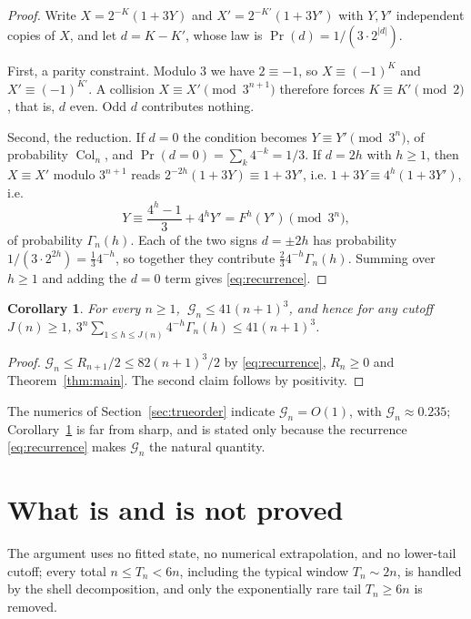 \documentclass[11pt,reqno]{amsart}
\theoremstyle{plain}
\newtheorem{corollary}[theorem]{Corollary}
\theoremstyle{definition}
\theoremstyle{remark}
\newcommand{\Col}{\operatorname{Col}}
\newcommand{\Prob}{\operatorname{Pr}}
\begin{document}
\begin{proof}
Write $X=2^{-K}(1+3Y)$ and $X'=2^{-K'}(1+3Y')$ with $Y,Y'$ independent
copies of $X$, and let $d=K-K'$, whose law is
$\Prob(d)=1/(3\cdot2^{|d|})$.

First, a parity constraint. Modulo $3$ we have $2\equiv-1$, so
$X\equiv(-1)^K$ and $X'\equiv(-1)^{K'}$. A collision $X\equiv X'\pmod
{3^{n+1}}$ therefore forces $K\equiv K'\pmod2$, that is, $d$ even. Odd $d$
contributes nothing.

Second, the reduction. If $d=0$ the condition becomes $Y\equiv Y'\pmod
{3^n}$, of probability $\Col_n$, and $\Prob(d=0)=\sum_k4^{-k}=1/3$. If
$d=2h$ with $h\ge1$, then $X\equiv X'$ modulo $3^{n+1}$ reads
$2^{-2h}(1+3Y)\equiv1+3Y'$, i.e. $1+3Y\equiv4^h(1+3Y')$, i.e.
\[
Y\equiv\frac{4^h-1}3+4^hY'=F^h(Y')\pmod{3^n},
\]
of probability $\Gamma_n(h)$. Each of the two signs $d=\pm2h$ has
probability $1/(3\cdot2^{2h})=\tfrac13 4^{-h}$, so together they contribute
$\tfrac23 4^{-h}\Gamma_n(h)$. Summing over $h\ge1$ and adding the $d=0$
term gives \eqref{eq:recurrence}.
\end{proof}

\begin{corollary}\label{cor:G}
For every $n\ge1$, $\ \mathcal G_n\le41(n+1)^3$, and hence for any cutoff
$J(n)\ge1$,
$3^n\sum_{1\le h\le J(n)}4^{-h}\Gamma_n(h)\le41(n+1)^3$.
\end{corollary}

\begin{proof}
$\mathcal G_n\le R_{n+1}/2\le82(n+1)^3/2$ by \eqref{eq:recurrence},
$R_n\ge0$ and Theorem~\ref{thm:main}. The second claim follows by
positivity.
\end{proof}

The numerics of Section~\ref{sec:trueorder} indicate
$\mathcal G_n=O(1)$, with $\mathcal G_n\approx0.235$; Corollary~\ref{cor:G}
is far from sharp, and is stated only because the recurrence
\eqref{eq:recurrence} makes $\mathcal G_n$ the natural quantity.

\section{What is and is not proved}\label{sec:limits}

The argument uses no fitted state, no numerical extrapolation, and no
lower-tail cutoff; every total $n\le T_n<6n$, including the typical window
$T_n\sim2n$, is handled by the shell decomposition, and only the
exponentially rare tail $T_n\ge6n$ is removed.
\end{document}
